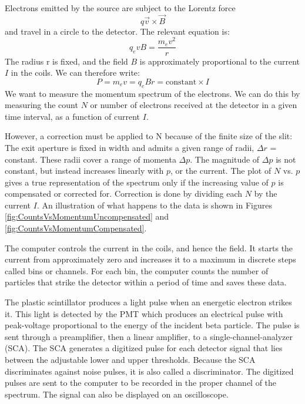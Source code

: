 \documentclass{../lab}
\begin{document}
Electrons emitted by the source are subject to the Lorentz force
\begin{equation}
    q \vec{v} \times \vec {B}
\end{equation}
and travel in a circle to the detector. The relevant equation is:
\begin{equation}
    q_e v B = \frac {m_e v^2}{r}
\end{equation}
The radius r is fixed, and the field $B$ is approximately proportional to the current $I$ in the coils. We can therefore write:
\begin{equation}
    P = m_e v = q_e B r = \text{constant} \times I
\end{equation}
We want to measure the momentum spectrum of the electrons. We can do this by measuring the count $N$ or number of electrons received at the detector in a given time interval, as a function of current $I$.

However, a correction must be applied to N because of the finite size of the slit: The exit aperture is fixed in width and admits a given range of radii, $\Delta r$ = constant. These radii cover a range of momenta $\Delta p$. The magnitude of $\Delta p$ is not constant, but instead increases linearly with $p$, or the current. The plot of $N$ vs. $p$ gives a true representation of the spectrum only if the increasing value of $p$ is compensated or corrected for. Correction is done by dividing each $N$ by the current $I$. An illustration of what happens to the data is shown in Figures \ref{fig:CountsVsMomentumUncompensated} and \ref{fig:CountsVsMomentumCompensated}.

The computer controls the current in the coils, and hence the field. It starts the current from approximately zero and increases it to a maximum in discrete steps called bins or channels. For each bin, the computer counts the number of particles that strike the detector within a period of time and saves these data.

The plastic scintillator produces a light pulse when an energetic electron strikes it. This light is detected by the PMT which produces an electrical pulse with peak-voltage proportional to the energy of the incident beta particle. The pulse is sent through a preamplifier, then a linear amplifier, to a single-channel-analyzer (SCA). The SCA generates a digitized pulse for each detector signal that lies between the adjustable lower and upper thresholds. Because the SCA discriminates against noise pulses, it is also called a discriminator. The digitized pulses are sent to the computer to be recorded in the proper channel of the spectrum. The signal can also be displayed on an oscilloscope.
\end{document}
